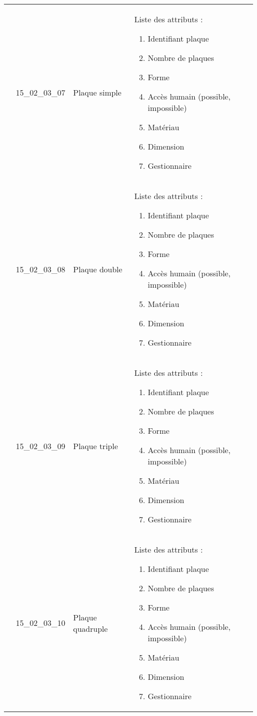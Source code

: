 \documentclass[12pt,titlepage]{book}
\begin{document}
\begin{supertabular}{|p{10cm}|c|p{13cm}|p{12cm}|}
                    & 15\_02\_03\_07 & Plaque simple & Liste des attributs :
\begin{enumerate}
  \item Identifiant plaque  \item Nombre de plaques  \item Forme  \item Accès humain (possible, impossible)  \item Matériau  \item Dimension  \item Gestionnaire\end{enumerate}
\\


                    & 15\_02\_03\_08 & Plaque double & Liste des attributs :
\begin{enumerate}
  \item Identifiant plaque  \item Nombre de plaques  \item Forme  \item Accès humain (possible, impossible)  \item Matériau  \item Dimension  \item Gestionnaire\end{enumerate}
\\


                    & 15\_02\_03\_09 & Plaque triple & Liste des attributs :
\begin{enumerate}
  \item Identifiant plaque  \item Nombre de plaques  \item Forme  \item Accès humain (possible, impossible)  \item Matériau  \item Dimension  \item Gestionnaire\end{enumerate}
\\


                    & 15\_02\_03\_10 & Plaque quadruple & Liste des attributs :
\begin{enumerate}
  \item Identifiant plaque  \item Nombre de plaques  \item Forme  \item Accès humain (possible, impossible)  \item Matériau  \item Dimension  \item Gestionnaire\end{enumerate}
\\
\hline
\end{supertabular}
\end{document}
